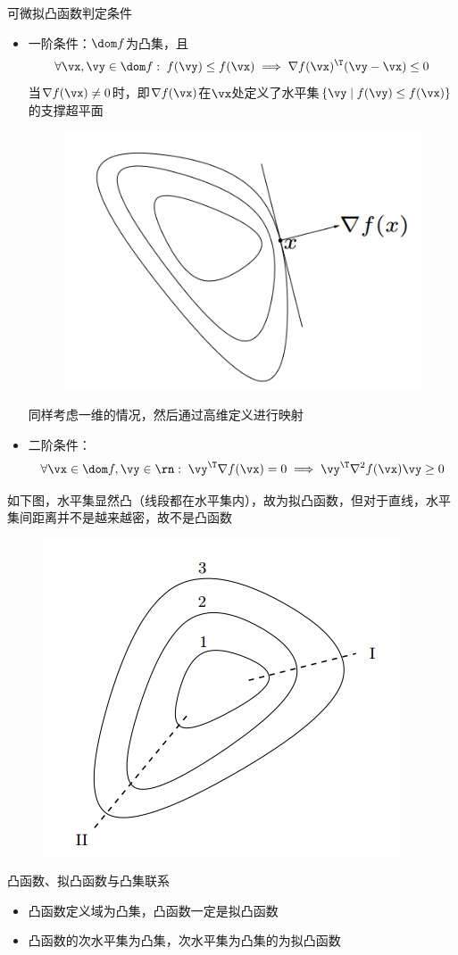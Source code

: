 \begin{theorem}
	可微拟凸函数判定条件
	\begin{itemize}
		\item 一阶条件：$\dom f$为凸集，且
		\[\forall \vx,\vy\in\dom f:\;f(\vy)\leq f(\vx)\implies\nabla f(\vx)^\T(\vy-\vx)\leq 0\]
		当$\nabla f(\vx)\ne 0$时，即$\nabla f(\vx)$在$\vx$处定义了水平集$\{\vy\mid f(\vy)\leq f(\vx)\}$的支撑超平面
		\begin{figure}[H]
			\centering
			\includegraphics[width=0.4\linewidth]{fig/support-plane.PNG}
		\end{figure}
		\begin{analysis}
			同样考虑一维的情况，然后通过高维定义进行映射
		\end{analysis}
		\item 二阶条件：
		\[\forall \vx\in\dom f,\vy\in\rn:\;\vy^\T\nabla f(\vx)=0\implies \vy^\T\nabla^2f(\vx)\vy\geq 0\]
	\end{itemize}
\end{theorem}

\begin{example}[(拟)凸函数的判定]
	如下图，水平集显然凸（线段都在水平集内），故为拟凸函数，但对于直线\uppercase\expandafter{}，水平集间距离并不是越来越密，故不是凸函数
	\begin{figure}[H]
		\centering
		\includegraphics[width=0.35\linewidth]{fig/example-convex-function.PNG}
	\end{figure}
\end{example}

凸函数、拟凸函数与凸集联系
\begin{itemize}
	\item 凸函数定义域为凸集，凸函数一定是拟凸函数
	\item 凸函数的次水平集为凸集，次水平集为凸集的为拟凸函数
\end{itemize}